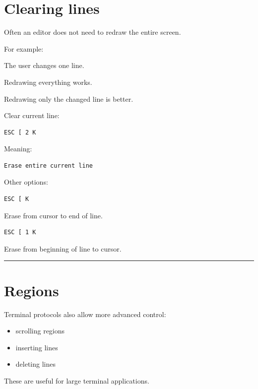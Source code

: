 \documentclass[
  oneside,
  openany]{book}
\providecommand{\tightlist}{%
  \setlength{\itemsep}{0pt}\setlength{\parskip}{0pt}}
\begin{document}
\hypertarget{clearing-lines}{%
\section{Clearing lines}\label{clearing-lines}}

Often an editor does not need to redraw the entire screen.

For example:

The user changes one line.

Redrawing everything works.

Redrawing only the changed line is better.

Clear current line:

\begin{verbatim}
ESC [ 2 K
\end{verbatim}

Meaning:

\begin{verbatim}
Erase entire current line
\end{verbatim}

Other options:

\begin{verbatim}
ESC [ K
\end{verbatim}

Erase from cursor to end of line.

\begin{verbatim}
ESC [ 1 K
\end{verbatim}

Erase from beginning of line to cursor.

\begin{center}\rule{0.5\linewidth}{0.5pt}\end{center}

\hypertarget{regions}{%
\section{Regions}\label{regions}}

Terminal protocols also allow more advanced control:

\begin{itemize}
\tightlist
\item
  scrolling regions
\item
  inserting lines
\item
  deleting lines
\end{itemize}

These are useful for large terminal applications.
\end{document}
